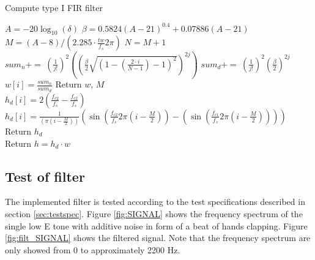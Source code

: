 \begin{algorithm}[H]
\caption{Compute type I FIR filter}
\label{alg:FIR}
\begin{algorithmic}[1] 
\State $A=-20\log_{10}(\delta)$ 
\State $\beta = 0.5824(A-21)^{0.4} + 0.07886(A-21)$ 
\State $M = (A-8)/(2.285 \cdot \frac{tw}{f_s} 2\pi)$ 
\State $N = M+1$ 
			\State $ sum_n + = \ (\frac{1}{j!})^2 \left( \left( \frac{\beta}{2} \sqrt{\left(1 - \left( \frac{2 \cdot i}{N-1}\right) - 1\right)^2}\right)^{2j}\right)$
			\State $ sum_d + = \ (\frac{1}{j!})^2 \left( \frac{\beta}{2}\right)^{2j}$
		\EndFor
		\State $w[i]=\frac{sum_n}{sum_d}$
	\EndFor
	\State Return $w$, $M$
\EndProcedure
\\
        		\State $h_d[i] = 2( \frac{f_{c2}}{f_s} - \frac{f_{c2}}{f_s})$
        	\Else 
        		\State  $h_d[i] = \frac{1}{ (\pi (i - \frac{M}{2}))}(\sin(\frac{f_{c2}}{f_s} 2 \pi (i - \frac{M}{2})) - (\sin(\frac{f_{c1}}{f_s} 2 \pi (i - \frac{M}{2}))))$ 
          	\EndIf 
  	\EndFor
  	\State Return $h_d$
\EndProcedure
\\
	\State Return $h = h_d \cdot w$ 
\EndProcedure


\end{algorithmic}
\end{algorithm}

\subsection{Test of filter}
The implemented filter is tested according to the test specifications described in section \ref{sec:testspec}. Figure \ref{fig:SIGNAL} shows the frequency spectrum of the single low E tone with additive noise in form of a beat of hands clapping. Figure \ref{fig:filt_SIGNAL} shows the filtered signal. Note that the frequency spectrum are only showed from 0 to approximately 2200 Hz.  

